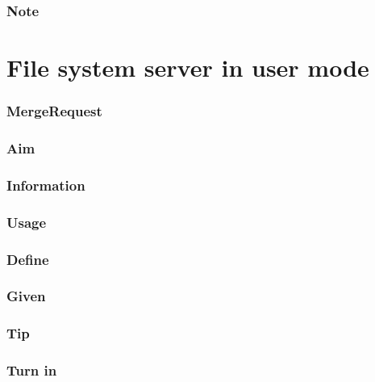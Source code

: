 \documentclass[]{book}
\begin{document}
\subsubsection*{Note}\label{note-17}

\section{File system server in user
mode}\label{file-system-server-in-user-mode}

\subsubsection*{MergeRequest}\label{mergerequest-17}

\subsubsection*{Aim}\label{aim-17}

\subsubsection*{Information}\label{information-16}

\subsubsection*{Usage}\label{usage-16}

\subsubsection*{Define}\label{define-16}

\subsubsection*{Given}\label{given-16}

\subsubsection*{Tip}\label{tip-16}

\subsubsection*{Turn in}\label{turn-in-16}
\end{document}
